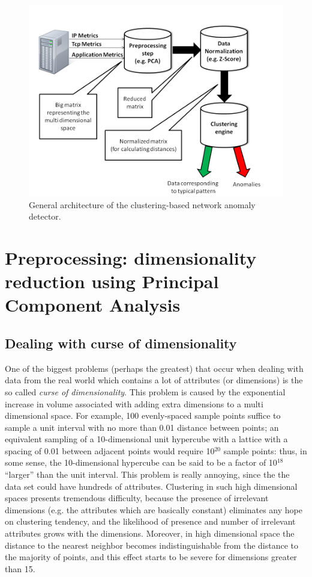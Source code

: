 \documentclass[12pt,a4paper,cucitura]{toptesi}
\begin{document}
\begin{figure}
\centering
\includegraphics[width=\textwidth]{clustering-architecture.png}
\caption[Clustering-based anomaly detector model]{General architecture of the clustering-based network anomaly detector.}
\end{figure}

\section{Preprocessing: dimensionality reduction using Principal Component Analysis}
\subsection{Dealing with curse of dimensionality}
One of the biggest problems (perhaps the greatest) that occur when dealing with data from the real world which contains a lot of attributes (or dimensions) is the so called \emph{curse of dimensionality}.
This problem is caused by the exponential increase in volume associated with adding extra dimensions to a multi dimensional space.
For example, 100 evenly-spaced sample points suffice to sample a unit interval with no more than 0.01 distance between points; an equivalent sampling of a 10-dimensional unit hypercube with a lattice with a spacing of 0.01 between adjacent points would require 10$^{20}$ sample points: thus, in some sense, the 10-dimensional hypercube can be said to be a factor of 10$^{18}$ ``larger'' than the unit interval.
This problem is really annoying, since the the data set could have hundreds of attributes.
Clustering in such high dimensional spaces presents tremendous difficulty, because the presence of irrelevant dimensions (e.g. the attributes which are basically constant) eliminates any hope on clustering tendency, and the likelihood of presence and number of irrelevant attributes grows with the dimensions.
Moreover, in high dimensional space the distance to the nearest neighbor becomes indistinguishable from the distance to the majority of points, and this effect starts to be severe for dimensions greater than 15. 
\end{document}

